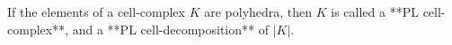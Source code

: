 If the elements of a cell-complex $K$ are polyhedra, then $K$ is called a **PL cell-complex**, and a **PL cell-decomposition** of $|K|$.
